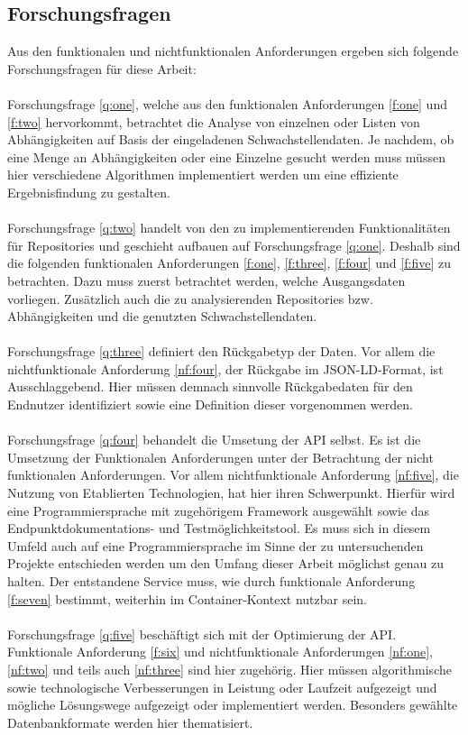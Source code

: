 \subsection{Forschungsfragen} \label{sec:Forschungsfragen}
    Aus den funktionalen und nichtfunktionalen Anforderungen ergeben sich folgende Forschungsfragen für diese Arbeit:
    \\ \\
    Forschungsfrage \ref{q:one}, welche aus den funktionalen Anforderungen \ref{f:one} und \ref{f:two} hervorkommt, betrachtet die Analyse von einzelnen oder Listen von Abhängigkeiten auf Basis der eingeladenen Schwachstellendaten.
    Je nachdem, ob eine Menge an Abhängigkeiten oder eine Einzelne gesucht werden muss müssen hier verschiedene Algorithmen implementiert werden um eine effiziente Ergebnisfindung zu gestalten.
    \\ \\
    Forschungsfrage \ref{q:two} handelt von den zu implementierenden Funktionalitäten für Repositories und geschieht aufbauen auf Forschungsfrage \ref{q:one}.
    Deshalb sind die folgenden funktionalen Anforderungen \ref{f:one}, \ref{f:three}, \ref{f:four} und \ref{f:five} zu betrachten.
    Dazu muss zuerst betrachtet werden, welche Ausgangsdaten vorliegen.
    Zusätzlich auch die zu analysierenden Repositories bzw. Abhängigkeiten und die genutzten Schwachstellendaten.
    \\ \\
    Forschungsfrage \ref{q:three} definiert den Rückgabetyp der Daten.
    Vor allem die nichtfunktionale Anforderung \ref{nf:four}, der Rückgabe im JSON-LD-Format, ist Ausschlaggebend.
    Hier müssen demnach sinnvolle Rückgabedaten für den Endnutzer identifiziert sowie eine Definition dieser vorgenommen werden.
    \\ \\
    Forschungsfrage \ref{q:four} behandelt die Umsetung der API selbst.
    Es ist die Umsetzung der Funktionalen Anforderungen unter der Betrachtung der nicht funktionalen Anforderungen.
    Vor allem nichtfunktionale Anforderung \ref{nf:five}, die Nutzung von Etablierten Technologien, hat hier ihren Schwerpunkt.
    Hierfür wird eine Programmiersprache mit zugehörigem Framework ausgewählt sowie das Endpunktdokumentations- und Testmöglichkeitstool.
    Es muss sich in diesem Umfeld auch auf eine Programmiersprache im Sinne der zu untersuchenden Projekte entschieden werden um den Umfang dieser Arbeit möglichst genau zu halten.
    Der entstandene Service muss, wie durch funktionale Anforderung \ref{f:seven} bestimmt, weiterhin im Container-Kontext nutzbar sein.
    \\ \\
    Forschungsfrage \ref{q:five} beschäftigt sich mit der Optimierung der API.
    Funktionale Anforderung \ref{f:six} und nichtfunktionale Anforderungen \ref{nf:one}, \ref{nf:two} und teils auch \ref{nf:three} sind hier zugehörig.
    Hier müssen algorithmische sowie technologische Verbesserungen in Leistung oder Laufzeit aufgezeigt und mögliche Lösungswege aufgezeigt oder implementiert werden.
    Besonders gewählte Datenbankformate werden hier thematisiert.

    
    